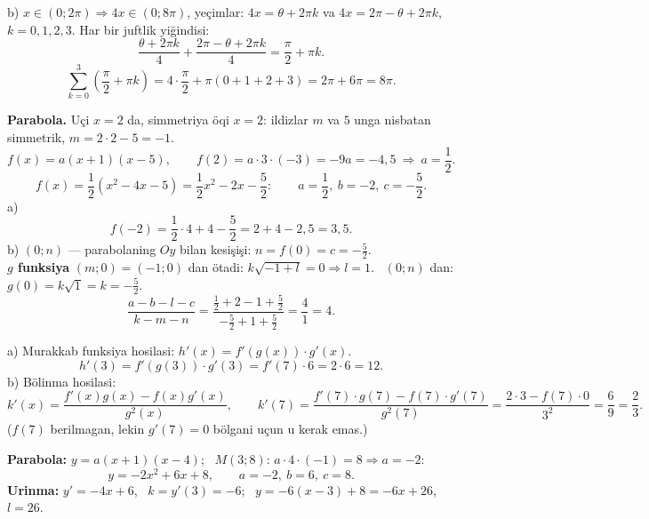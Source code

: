 b) $x\in(0;2\pi)\Rightarrow 4x\in(0;8\pi)$, yeçimlar: $4x=\theta+2\pi k$ va $4x=2\pi-\theta+2\pi k$, \ $k=0,1,2,3$. Har bir juftlik yiğindisi:
\[\frac{\theta+2\pi k}4+\frac{2\pi-\theta+2\pi k}4=\frac\pi2+\pi k.\]
\[\sum_{k=0}^{3}\left(\frac\pi2+\pi k\right)=4\cdot\frac\pi2+\pi(0+1+2+3)=2\pi+6\pi=8\pi.\]

\newpage
{}
\textbf{Parabola.} Uçi $x=2$ da, simmetriya öqi $x=2$: ildizlar $m$ va $5$ unga nisbatan simmetrik, $m=2\cdot2-5=-1$.
\[f(x)=a(x+1)(x-5),\qquad f(2)=a\cdot3\cdot(-3)=-9a=-4{,}5\ \Rightarrow\ a=\frac12.\]
\[f(x)=\frac12(x^2-4x-5)=\frac12x^2-2x-\frac52:\qquad a=\frac12,\ b=-2,\ c=-\frac52.\]
a) \[f(-2)=\frac12\cdot4+4-\frac52=2+4-2{,}5=3{,}5.\]
b) $(0;n)$ — parabolaning $Oy$ bilan kesişişi: $n=f(0)=c=-\frac52$.\\
\textbf{$g$ funksiya} $(m;0)=(-1;0)$ dan ötadi: $k\sqrt{-1+l}=0\Rightarrow l=1$. \ $(0;n)$ dan: $g(0)=k\sqrt1=k=-\frac52$.
\[\frac{a-b-l-c}{k-m-n}=\frac{\frac12+2-1+\frac52}{-\frac52+1+\frac52}=\frac{4}{1}=4.\]

\newpage
{}
a) Murakkab funksiya hosilasi: $h'(x)=f'(g(x))\cdot g'(x)$.
\[h'(3)=f'(g(3))\cdot g'(3)=f'(7)\cdot6=2\cdot6=12.\]
b) Bölinma hosilasi:
\[k'(x)=\frac{f'(x)g(x)-f(x)g'(x)}{g^2(x)},\qquad k'(7)=\frac{f'(7)\cdot g(7)-f(7)\cdot g'(7)}{g^2(7)}=\frac{2\cdot3-f(7)\cdot0}{3^2}=\frac69=\frac23.\]
($f(7)$ berilmagan, lekin $g'(7)=0$ bölgani uçun u kerak emas.)

\newpage
{}
\textbf{Parabola:} $y=a(x+1)(x-4)$; \ $M(3;8)$: $a\cdot4\cdot(-1)=8\Rightarrow a=-2$:
\[y=-2x^2+6x+8,\qquad a=-2,\ b=6,\ c=8.\]
\textbf{Urinma:} $y'=-4x+6$, \ $k=y'(3)=-6$; \ $y=-6(x-3)+8=-6x+26$, \ $l=26$.

